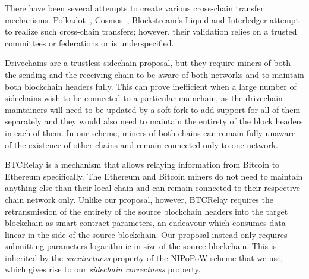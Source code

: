 There have been several attempts to create various cross-chain transfer
mechanisms. Polkadot~\cite{wood2016polkadot},
Cosmos~\cite{buchman2016tendermint}, Blockstream's Liquid and Interledger
attempt to realize such cross-chain transfers; however, their validation relies
on a trusted committees or federations or is underspecified.

Drivechains are a trustless sidechain proposal, but they require miners of both
the sending and the receiving chain to be aware of both networks and to maintain
both blockchain headers fully. This can prove inefficient when a large number of
sidechains wish to be connected to a particular mainchain, as the drivechain
maintainers will need to be updated by a soft fork to add support for all of
them separately and they would also need to maintain the entirety of the block
headers in each of them. In our scheme, miners of both chains can remain fully
unaware of the existence of other chains and remain connected only to one
network.

BTCRelay is a mechanism that allows relaying information from Bitcoin to
Ethereum specifically. The Ethereum and Bitcoin miners do not need to maintain
anything else than their local chain and can remain connected to their
respective chain network only. Unlike our proposal, however, BTCRelay requires
the retransmission of the entirety of the source blockchain headers into the
target blockchain as smart contract parameters, an endeavour which consumes data
linear in the side of the source blockchain. Our proposal instead only requires
submitting parameters logarithmic in size of the source blockchain. This is
inherited by the \emph{succinctness} property of the NIPoPoW scheme that we use,
which gives rise to our \emph{sidechain correctness} property.
